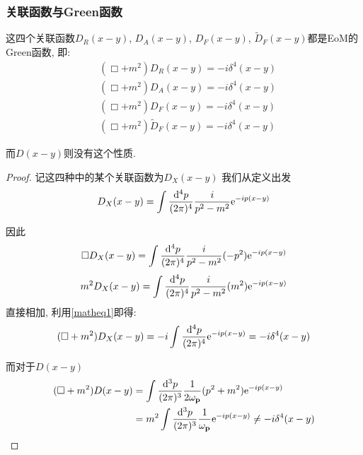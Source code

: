 \subsubsection{关联函数与Green函数}
\begin{theorem}[关联函数的性质]
    这四个关联函数$D_R(x-y)$, $D_A(x-y)$, $D_F(x-y)$, $\widetilde D_F(x-y)$都是EoM的Green函数, 即:
    \begin{equation}
        \begin{split}
            &(\Box+m^2)D_R(x-y)=-i\delta^4(x-y)\\
            &(\Box+m^2)D_A(x-y)=-i\delta^4(x-y)\\
            &(\Box+m^2)D_F(x-y)=-i\delta^4(x-y)\\
            &(\Box+m^2)\widetilde D_F(x-y)=-i\delta^4(x-y)
        \end{split}
    \end{equation}

    而$D(x-y)$则没有这个性质.
\end{theorem}
\begin{proof}
    记这四种中的某个关联函数为$D_X(x-y)$
    我们从定义出发
    \begin{equation}
        D_X(x-y)=\int\frac{\mathrm d^4p}{(2\pi)^4} \frac i{p^2-m^2}\mathrm e^{-ip(x-y)}
    \end{equation}

    因此
    \begin{equation}
        \Box D_X(x-y)=\int\frac{\mathrm d^4p}{(2\pi)^4} \frac i{p^2-m^2}(-p^2)\mathrm e^{-ip(x-y)}
    \end{equation}
    \begin{equation}
        m^2 D_X(x-y)=\int\frac{\mathrm d^4p}{(2\pi)^4} \frac i{p^2-m^2}(m^2)\mathrm e^{-ip(x-y)}
    \end{equation}
    直接相加, 利用\eqref{matheq1}即得:
    \begin{equation}
        (\Box+m^2)D_X(x-y)=-i\int\frac{\mathrm d^4p}{(2\pi)^4}\mathrm e^{-ip(x-y)}=-i\delta^4(x-y)
    \end{equation}

    而对于$D(x-y)$
    \begin{align}
        (\Box+m^2)D(x-y)&=\int\ld p(p^2+m^2)\exp{-ip(x-y)}\\
        &=m^2\int\ddd p\frac1{\omega_{\vec p}}\exp{-ip(x-y)}\neq-i\delta^4(x-y)
    \end{align}
\end{proof}

